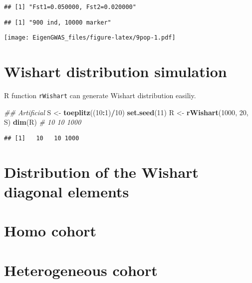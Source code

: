 \documentclass[]{book}
\newenvironment{Shaded}{\begin{snugshade}}{\end{snugshade}}
\newcommand{\CommentTok}[1]{\textcolor[rgb]{0.56,0.35,0.01}{\textit{#1}}}
\newcommand{\DecValTok}[1]{\textcolor[rgb]{0.00,0.00,0.81}{#1}}
\newcommand{\KeywordTok}[1]{\textcolor[rgb]{0.13,0.29,0.53}{\textbf{#1}}}
\newcommand{\NormalTok}[1]{#1}
\newcommand{\OperatorTok}[1]{\textcolor[rgb]{0.81,0.36,0.00}{\textbf{#1}}}
\newcommand{\StringTok}[1]{\textcolor[rgb]{0.31,0.60,0.02}{#1}}
\begin{document}
\begin{verbatim}
## [1] "Fst1=0.050000, Fst2=0.020000"
\end{verbatim}

\begin{verbatim}
## [1] "900 ind, 10000 marker"
\end{verbatim}

\texttt{[image: EigenGWAS\_files/figure-latex/9pop-1.pdf]}

\hypertarget{wishart-distribution-simulation}{%
\section{Wishart distribution
simulation}\label{wishart-distribution-simulation}}

R function \texttt{rWishart} can generate Wishart distribution easiliy.

\begin{Shaded}
\begin{Highlighting}[]
\CommentTok{## Artificial}
\NormalTok{S <-}\StringTok{ }\KeywordTok{toeplitz}\NormalTok{((}\DecValTok{10}\OperatorTok{:}\DecValTok{1}\NormalTok{)}\OperatorTok{/}\DecValTok{10}\NormalTok{)}
\KeywordTok{set.seed}\NormalTok{(}\DecValTok{11}\NormalTok{)}
\NormalTok{R <-}\StringTok{ }\KeywordTok{rWishart}\NormalTok{(}\DecValTok{1000}\NormalTok{, }\DecValTok{20}\NormalTok{, S)}
\KeywordTok{dim}\NormalTok{(R)  }\CommentTok{#  10 10  1000}
\end{Highlighting}
\end{Shaded}

\begin{verbatim}
## [1]   10   10 1000
\end{verbatim}

\hypertarget{distribution-of-the-wishart-diagonal-elements}{%
\section{Distribution of the Wishart diagonal
elements}\label{distribution-of-the-wishart-diagonal-elements}}

\hypertarget{homo-cohort}{%
\section{Homo cohort}\label{homo-cohort}}

\hypertarget{heterogeneous-cohort}{%
\section{Heterogeneous cohort}\label{heterogeneous-cohort}}
\end{document}
